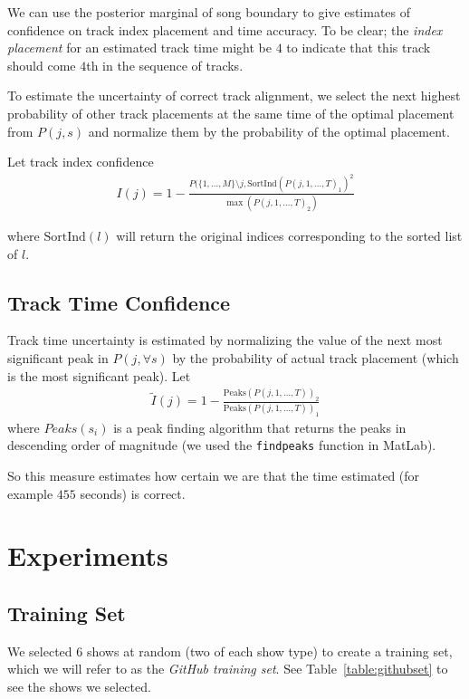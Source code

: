 \documentclass[twocolumn]{article}
\begin{document}
We can use the posterior marginal of song boundary to give estimates of confidence on track index placement and time accuracy. To be clear; the \textit{index placement} for an estimated track time might be $4$ to indicate that this track should come $4$th in the sequence of tracks.

To estimate the uncertainty of correct track alignment, we select the next highest probability of other track placements at the same time of the optimal placement from $P(j,s)$ and normalize them by the probability of the optimal placement.

Let track index confidence
\begin{align*}
I( j ) = 1-\frac{ P( \{1,\ldots,M\} \setminus j, \mathrm{SortInd}( P(j, 1,\ldots,T)_1)^2 }{ \max( P(j, 1,\ldots,T)_2) }
\end{align*}

where $\mathrm{SortInd}(l)$ will return the original indices corresponding to the sorted list of $l$. 

\subsection{Track Time Confidence}

Track time uncertainty is estimated by normalizing the value of the next most significant peak in $P(j,\forall s)$ by the probability of actual track placement (which is the most significant peak). 
Let 
\begin{align*}
\tilde I( j ) = 1-\frac{ \mathrm{Peaks}( P(j, 1,\ldots,T ) )_2 } { \mathrm{Peaks}( P(j, 1,\ldots,T ))_1 }
\end{align*} where $Peaks(s_i)$ is a peak finding algorithm that returns the peaks in descending order of magnitude (we used the \texttt{findpeaks} function in MatLab).

So this measure estimates how certain we are that the time estimated (for example $455$ seconds) is correct.

\section{Experiments}\label{sec:experiments}

\subsection{Training Set}\label{sec:training-set}

We selected $6$ shows at random (two of each show type)  to create a training set, which we will refer to as the \textit{GitHub training set}. See Table~\ref{table:githubset} to see the shows we selected.
\end{document}
